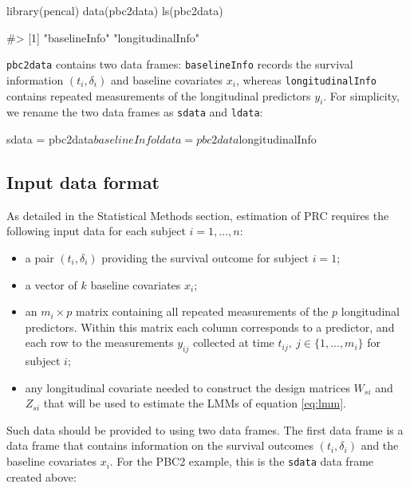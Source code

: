 \begin{Schunk}
\begin{Sinput}
library(pencal)
data(pbc2data)
ls(pbc2data)
\end{Sinput}
\begin{Soutput}
#> [1] "baselineInfo"     "longitudinalInfo"
\end{Soutput}
\end{Schunk}

\texttt{pbc2data} contains two data frames: \texttt{baselineInfo}
records the survival information \((t_i, \delta_i)\) and baseline
covariates \(x_i\), whereas \texttt{longitudinalInfo} contains repeated
measurements of the longitudinal predictors \(y_i\). For simplicity, we
rename the two data frames as \texttt{sdata} and \texttt{ldata}:

\begin{Schunk}
\begin{Sinput}
sdata = pbc2data$baselineInfo
ldata = pbc2data$longitudinalInfo
\end{Sinput}
\end{Schunk}

\subsection{Input data format}\label{input-data-format}

As detailed in the Statistical Methods section, estimation of PRC
requires the following input data for each subject \(i = 1, ..., n\):

\begin{itemize}
\tightlist
\item
  a pair \((t_i, \delta_i)\) providing the survival outcome for subject
  \(i = 1\);
\item
  a vector of \(k\) baseline covariates \(x_i\);
\item
  an \(m_i \times p\) matrix containing all repeated measurements of the
  \(p\) longitudinal predictors. Within this matrix each column
  corresponds to a predictor, and each row to the measurements
  \(y_{ij}\) collected at time \(t_{ij}, \: j \in \{1, ..., m_i \}\) for
  subject \(i\);
\item
  any longitudinal covariate needed to construct the design matrices
  \(W_{si}\) and \(Z_{si}\) that will be used to estimate the LMMs of
  equation \eqref{eq:lmm}.
\end{itemize}

Such data should be provided to  using two data frames.
The first data frame is a data frame that contains information on the
survival outcomes \((t_i, \delta_i)\) and the baseline covariates
\(x_i\). For the PBC2 example, this is the \texttt{sdata} data frame
created above:


